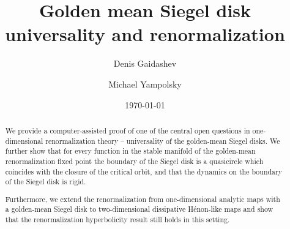 \documentclass[12pt, reqno]{amsart}
\theoremstyle{definition}
\theoremstyle{remark}
\numberwithin{equation}{section}
\begin{document}
\addtolength{\evensidemargin}{-0.7in}
\addtolength{\oddsidemargin}{-0.7in}










\setcounter{tocdepth}{1}

%
\title[Siegel disk universality and renormalization]{Golden mean Siegel disk universality and renormalization}



\author{Denis Gaidashev}
\address{Denis Gaidashev, Uppsala University, Uppsala, Sweden}

\author{Michael Yampolsky}
\address{Michael Yampolsky, University of Toronto, Toronto, Canada}




\date{\today}


\maketitle

\begin{abstract}
We provide a computer-assisted proof of one of  the central open questions in one-dimensional renormalization theory -- universality of the golden-mean Siegel disks. We further show that for every function in the stable manifold of the golden-mean renormalization fixed point the boundary of the Siegel disk is a quasicircle which coincides with the closure of the critical orbit, and that the dynamics on the boundary of the Siegel disk is rigid. 

Furthermore, we extend the renormalization from one-dimensional analytic maps with a golden-mean Siegel disk 
to two-dimensional  dissipative H\'enon-like maps and show that the renormalization hyperbolicity result still 
holds in this setting. 
\end{abstract}

\tableofcontents













\end{document}
